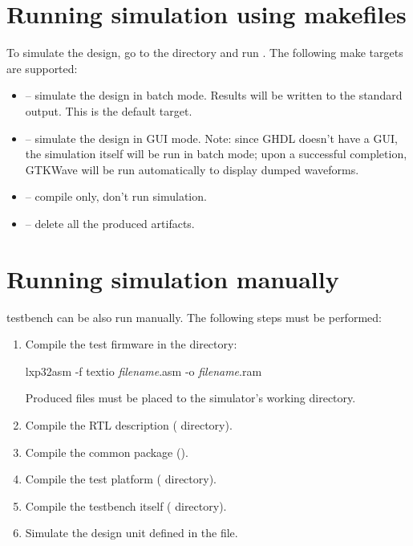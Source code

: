 \documentclass[a4paper,12pt,twoside,extrafontsizes]{memoir}
\begin{document}
\section{Running simulation using makefiles}

To simulate the design, go to the  directory and run . The following make targets are supported:

\begin{itemize}
	\item {} -- simulate the design in batch mode. Results will be written to the standard output. This is the default target.
	\item {} -- simulate the design in GUI mode. Note: since GHDL doesn't have a GUI, the simulation itself will be run in batch mode; upon a successful completion, GTKWave will be run automatically to display dumped waveforms.
	\item {} -- compile only, don't run simulation.
	\item {} -- delete all the produced artifacts.
\end{itemize}

\section{Running simulation manually}
\label{sec:simmanual}

\lxp{} testbench can be also run manually. The following steps must be performed:

\begin{enumerate}
	\item Compile the test firmware in the  directory:
	
	\begin{codepar}
    lxp32asm -f textio \emph{filename}.asm -o \emph{filename}.ram
	\end{codepar}
	
	Produced  files must be placed to the simulator's working directory.
	\item Compile the \lxp{} RTL description ( directory).
	\item Compile the common package ().
	\item Compile the test platform ( directory).
	\item Compile the testbench itself ( directory).
	\item Simulate the  design unit defined in the  file.
\end{enumerate}
\end{document}
